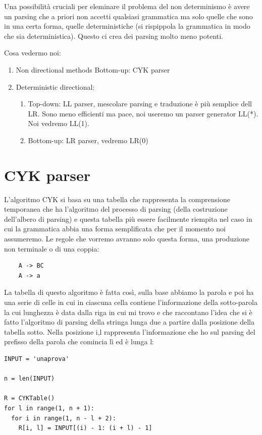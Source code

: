 Una possibilità cruciali per eleminare il problema del non determinismo è avere un parsing che a priori non accetti qualsiasi grammatica ma solo quelle che sono in una certa forma, quelle deterministiche (si rispippola la grammatica in modo che sia deterministica). Questo ci crea dei parsing molto meno potenti.

Cosa vedermo noi:
\begin{enumerate}
    \item Non directional methods Bottom-up: CYK parser
    \item Deterministic directional:
    \begin{enumerate}
        \item Top-down: LL parser, mescolare parsing e traduzione è più semplice dell LR. Sono meno efficienti ma pace, noi useremo un parser generator LL(*). Noi vedremo LL(1).
        \item Bottom-up: LR parser, vedremo LR(0)
    \end{enumerate}
\end{enumerate}

\section{CYK parser}
L'algoritmo CYK si basa su una tabella che rappresenta la comprensione temporanea che ha l'algoritmo del processo di parsing (della costruzione dell'albero di parsing) e questa tabella più essere facilmente riempita nel caso in cui la grammatica abbia una forma semplificata che per il momento noi assumeremo. Le regole che vorremo avranno solo questa forma, una produzione non terminale o di una coppia:
\begin{lstlisting}
    A -> BC
    A -> a
\end{lstlisting}

La tabella di questo algoritmo è fatta così, sulla base abbiamo la parola e poi ha una serie di celle in cui in ciascuna cella contiene l'informazione della sotto-parola la cui lunghezza è data dalla riga in cui mi trovo e che raccontano l'idea che si è fatto l'algoritmo di parsing della stringa lunga due a partire dalla posizione della tabella sotto. Nella posizione i,l rappresenta l'informazione che ho sul parsing del prefisso della parola che comincia lì ed è lunga l:
\begin{lstlisting}
INPUT = 'unaprova'

n = len(INPUT)

R = CYKTable()
for l in range(1, n + 1):
  for i in range(1, n - l + 2): 
    R[i, l] = INPUT[(i) - 1: (i + l) - 1]
\end{lstlisting}

